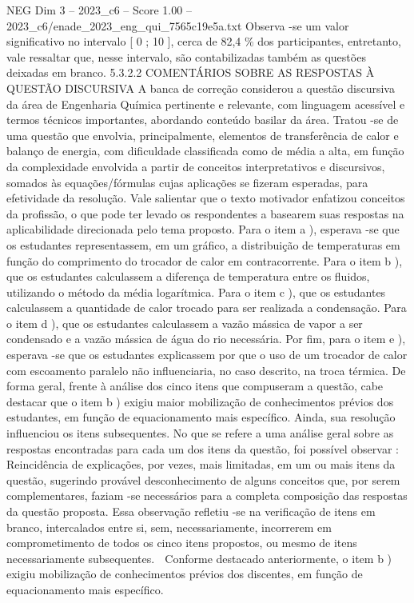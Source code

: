 \begin{textsample}{NEG Dim 3 – 2023\_c6 – Score 1.00 – 2023\_c6/enade\_2023\_eng\_qui\_7565c19e5a.txt}
Observa -se um valor significativo no intervalo [ 0 ; 10 ], cerca de 82,4 \% dos participantes, entretanto, vale ressaltar que, nesse intervalo, são contabilizadas também as questões deixadas em branco. 5.3.2.2 COMENTÁRIOS SOBRE AS RESPOSTAS À QUESTÃO DISCURSIVA A banca de correção considerou a questão discursiva da área de Engenharia Química pertinente e relevante, com linguagem acessível e termos técnicos importantes, abordando conteúdo basilar da área.
Tratou -se de uma questão que envolvia, principalmente, elementos de transferência de calor e balanço de energia, com dificuldade classificada como de média a alta, em função da complexidade envolvida a partir de conceitos interpretativos e discursivos, somados às equações/fórmulas cujas aplicações se fizeram esperadas, para efetividade da resolução.
Vale salientar que o texto motivador enfatizou conceitos da profissão, o que pode ter levado os respondentes a basearem suas respostas na aplicabilidade direcionada pelo tema proposto.
Para o item a ), esperava -se que os estudantes representassem, em um gráfico, a distribuição de temperaturas em função do comprimento do trocador de calor em contracorrente.
Para o item b ), que os estudantes calculassem a diferença de temperatura entre os fluidos, utilizando o método da média logarítmica.
Para o item c ), que os estudantes calculassem a quantidade de calor trocado para ser realizada a condensação.
Para o item d ), que os estudantes calculassem a vazão mássica de vapor a ser condensado e a vazão mássica de água do rio necessária.
Por fim, para o item e ), esperava -se que os estudantes explicassem por que o uso de um trocador de calor com escoamento paralelo não influenciaria, no caso descrito, na troca térmica.
De forma geral, frente à análise dos cinco itens que compuseram a questão, cabe destacar que o item b ) exigiu maior mobilização de conhecimentos prévios dos estudantes, em função de equacionamento mais específico.
Ainda, sua resolução influenciou os itens subsequentes.
No que se refere a uma análise geral sobre as respostas encontradas para cada um dos itens da questão, foi possível observar :  Reincidência de explicações, por vezes, mais limitadas, em um ou mais itens da questão, sugerindo provável desconhecimento de alguns conceitos que, por serem complementares, faziam -se necessários para a completa composição das respostas da questão proposta.
Essa observação refletiu -se na verificação de itens em branco, intercalados entre si, sem, necessariamente, incorrerem em comprometimento de todos os cinco itens propostos, ou mesmo de itens necessariamente subsequentes.  Conforme destacado anteriormente, o item b ) exigiu mobilização de conhecimentos prévios dos discentes, em função de equacionamento mais específico.

\end{textsample}
